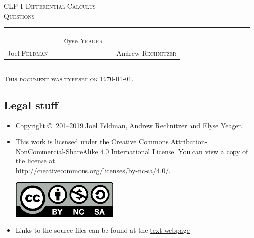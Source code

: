 \documentclass[12pt,letterpaper]{book}
\begin{document}
\setcounter{page}{0}

\begin{titlepage}
\begin{center}
\textsc{\LARGE
CLP-1 Differential Calculus\\[2ex]
Questions
}\\[2ex]

\vspace{5ex}
\hrule
\vspace{5ex}

\begin{tabular}{lcccr}
&& \large Elyse \textsc{Yeager} \\[3ex]
 Joel \textsc{Feldman}
&\quad & &\quad&
Andrew \textsc{Rechnitzer}
\end{tabular}

\end{center}
\vspace{2ex}
\hrule

\vfill
\textsc{This document was typeset on \today.}
\end{titlepage}

\subsection*{Legal stuff}
\begin{itemize}
 \item Copyright \copyright\ 201--2019 Joel Feldman, Andrew Rechnitzer and Elyse Yeager.

\item This work is licensed under the
Creative Commons Attribution-NonCommercial-ShareAlike 4.0 International
License. You can view a copy of the license at \\
\url{http://creativecommons.org/licenses/by-nc-sa/4.0/}.
\begin{center}
 \includegraphics{by-nc-sa.pdf}
\end{center}


\item Links to the source files can be found at the \href{http://www.math.ubc.ca/~CLP/index.html}{text webpage}
\end{itemize}


\frontmatter
\end{document}
